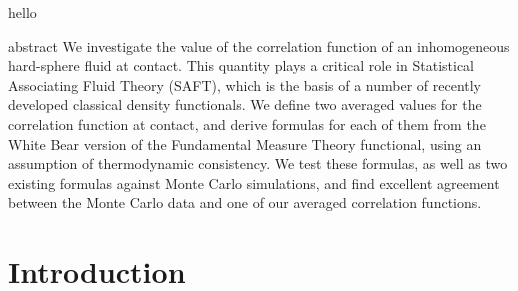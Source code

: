 hello

\newcommand{\red}[1]{{\bf \color{red} #1}}
\newcommand{\blue}[1]{{\bf \color{blue} #1}}
\newcommand{\green}[1]{{\bf \color{green} #1}}
\newcommand{\refnote}{\red{[ref]}}

\newcommand{\fixme}[1]{\red{[#1]}}

\newcommand{\derivation}[1]{} %

\newcommand{\needsworklater}[1]{\emph{[#1]}}
\newcommand{\needsworknow}[1]{\textcolor{red}{[\emph{#1}]}}
abstract
We investigate the value of the correlation function of an
inhomogeneous hard-sphere fluid at contact.  This
quantity plays a critical role in Statistical Associating Fluid
Theory (SAFT), which is the basis of a number of recently developed classical
density functionals.  We define two averaged values for the
correlation function at contact, and derive formulas for each of
them from the White Bear version of the Fundamental Measure Theory
functional, using an assumption of
thermodynamic consistency. We test these formulas, as well as two
existing formulas against Monte Carlo simulations, and find
excellent agreement between the Monte Carlo data and one of our
averaged correlation functions.

\section{Introduction}

\newcommand\saftlocaldft{felipe2001examination, gloor2002saft,%
  gloor2004accurate, clark2006developing, gloor2007prediction,%
  kahl2008modified, gross2009density}
\newcommand\saftnonlocaldft{yu2002fmt-dft-inhomogeneous-associating,%
  fu2005vapor-liquid-dft,bryk2006density}

